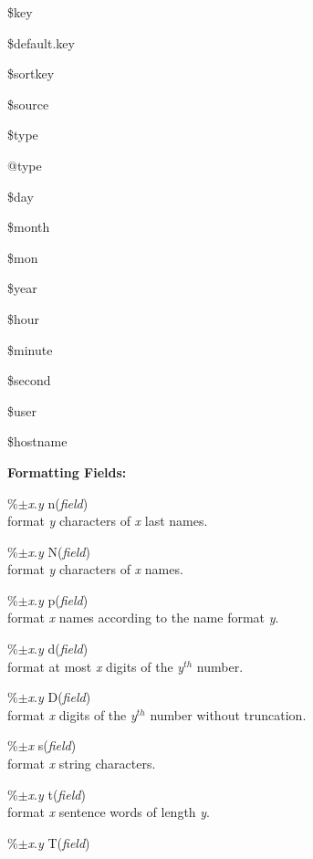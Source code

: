 \documentclass[a4paper]{article}
\newenvironment{FlatList}{\begin{list}{}{%
      \topsep=0pt\itemsep=0pt\parsep=0pt\let\makelabel=\flatlistlabel}}{\end{list}}%
\newcommand\flatlistlabel[1]{\descriptionlabel{\textsf{#1}}}
\begin{document}
\begin{multicols}{4}
  \begin{FlatList}
  \item [\$key]
  \item [\$default.key]
  \item [\$sortkey]
  \item [\$source]
  \item [\$type]
  \item [@type]
  \item [\$day]
  \item [\$month]
  \item [\$mon]
  \item [\$year]
  \item [\$hour]
  \item [\$minute]
  \item [\$second]
  \item [\$user]
  \item [\$hostname]
  \end{FlatList}
  \textbf{Formatting Fields:} 
  \begin{FlatList}
  \item [\%$\pm $\textit{x}.\textit{y}\/ n(\textit{field}\/)]\ \\
    format \textit{y}\/ characters of \textit{x}\/ last names.
  \item [\%$\pm $\textit{x}.\textit{y}\/ N(\textit{field}\/)]\ \\
    format \textit{y}\/ characters of \textit{x}\/ names.
  \item [\%$\pm $\textit{x}.\textit{y}\/ p(\textit{field}\/)]\ \\
    format \textit{x}\/ names according to the name format \textit{y}.
  \item [\%$\pm $\textit{x}.\textit{y}\/ d(\textit{field}\/)]\ \\
    format at most \textit{x}\/ digits of the \textit{y}$^{th}$ number.
  \item [\%$\pm $\textit{x}.\textit{y}\/ D(\textit{field}\/)]\ \\
    format \textit{x}\/ digits of the \textit{y}$^{th}$ number without truncation.
  \item [\%$\pm $\textit{x}\/ s(\textit{field}\/)]\ \\
    format \textit{x}\/ string characters.
  \item [\%$\pm $\textit{x}.\textit{y}\/ t(\textit{field}\/)]\ \\
    format \textit{x}\/ sentence words of length \textit{y}.
  \item [\%$\pm $\textit{x}.\textit{y}\/ T(\textit{field}\/)]\ \\

\end{FlatList}
\end{multicols}
\end{document}
